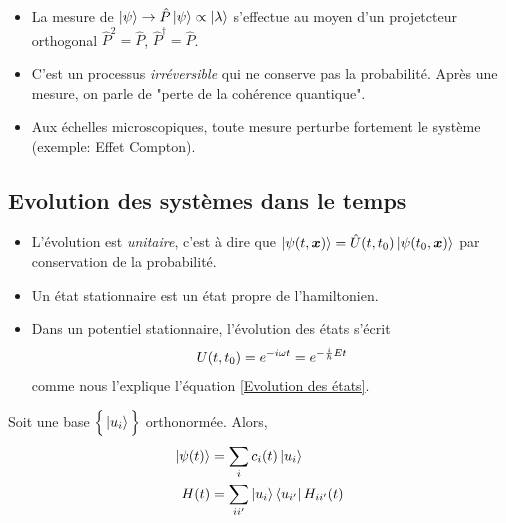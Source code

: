 \documentclass[../notesdecours.tex]{subfiles}
\begin{document}
\begin{itemize}
\item La mesure de $\ket{\psi} \rightarrow \hat{P}\ket{\psi} \propto \ket{\lambda}$ s'effectue au moyen d'un projetcteur orthogonal $\hat{P}^2 = \hat{P}$, $\hat{P}^\dagger = \hat{P}$.
\item C'est un processus \textit{irréversible} qui ne conserve pas la probabilité. Après une mesure, on parle de "perte de la cohérence quantique".
\item Aux échelles microscopiques, toute mesure perturbe fortement le système (exemple: Effet Compton). 
\end{itemize}

\subsection{Evolution des systèmes dans le temps}
\label{Postulat 5}
\begin{center}
\end{center}
\begin{itemize}
\item L'évolution est \textit{unitaire}, c'est à dire que $\ket{\psi (t,\bm{x})} = \hat{U} (t,t_0)\ket{\psi (t_0,\bm{x})}$ par conservation de la probabilité.
\item Un état stationnaire est un état propre de l'hamiltonien. 
\item Dans un potentiel stationnaire, l'évolution des états s'écrit
\begin{equation}
	U(t,t_0) = e^{-i\omega t} = e^{-\frac{i}{\hbar}Et}
\end{equation}
comme nous l'explique l'équation \eqref{Evolution des états}.
\end{itemize}
Soit une base $\Big\{\ket{u_i}\Big\}$ orthonormée. Alors,
\begin{align}
\ket{\psi(t)} &= \sum_i c_i(t)\ket{u_i}\\
H(t) &= \sum_{i i'} \ket{u_i}\bra{u_{i'}} H_{ii'} (t)
\end{align}
\end{document}
